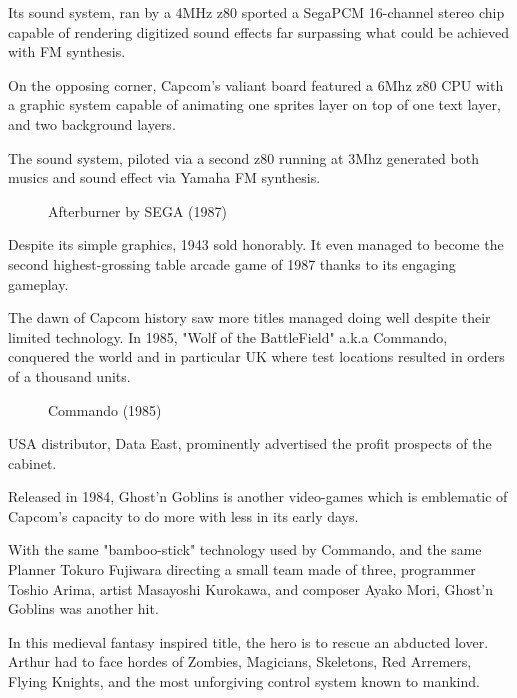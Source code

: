 Its sound system, ran by a 4MHz z80 sported a SegaPCM 16-channel stereo chip capable of rendering digitized sound effects far surpassing what could be achieved with FM synthesis.

On the opposing corner, Capcom's valiant board featured a 6Mhz z80 CPU with a graphic system capable of animating one sprites layer on top of one text layer, and two background layers. 

The sound system, piloted via a second z80 running at 3Mhz generated both musics and sound effect via Yamaha FM synthesis.




\begin{figure}[H]
\caption*{Afterburner by SEGA (1987)}
\end{figure}

Despite its simple graphics, 1943 sold honorably. It even managed to become the second highest-grossing table arcade game of 1987 thanks to its engaging gameplay. 

The dawn of Capcom history saw more titles managed doing well despite their limited technology. In 1985, "Wolf of the BattleField" a.k.a Commando, conquered the world and in particular UK where test locations resulted in orders of a thousand units\cite{cgm4}.

\begin{figure}[H]
\caption*{Commando (1985)}
\end{figure}

USA distributor, Data East, prominently advertised the profit prospects of the cabinet.
\vfill



Released in 1984, Ghost'n Goblins is another video-games which is emblematic of Capcom's capacity to do more with less in its early days. 

With the same "bamboo-stick" technology used by Commando, and the same Planner Tokuro Fujiwara directing a small team made of three, programmer Toshio Arima, artist Masayoshi Kurokawa, and composer Ayako Mori, Ghost'n Goblins was another hit.

In this medieval fantasy inspired title, the hero is to rescue an abducted lover. Arthur had to face hordes of Zombies, Magicians, Skeletons, Red Arremers, Flying Knights, and the most unforgiving control system known to mankind.

